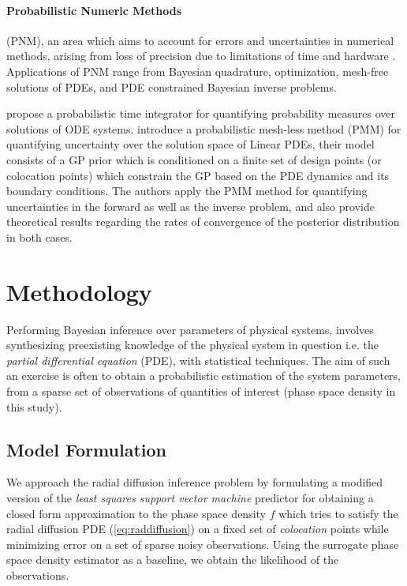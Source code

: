 \paragraph{Probabilistic Numeric Methods} (PNM), an area which aims to account for errors and 
uncertainties in numerical methods, arising from loss of precision due to limitations of time and 
hardware \citep{hennig2015probabilistic}. Applications of PNM range from Bayesian quadrature, 
optimization, mesh-free solutions of PDEs, and PDE constrained Bayesian inverse problems. 

\citet{conrad2017statistical} propose a probabilistic time integrator for quantifying probability 
measures over solutions of ODE systems. \citet{girolamiSullivanPDE} introduce a probabilistic 
mesh-less method (PMM) for quantifying uncertainty over the solution space of Linear PDEs, their 
model consists of a GP prior which is conditioned on a finite set of design points 
(or colocation points) which constrain the GP based on the PDE dynamics and its boundary 
conditions. The authors apply the PMM method for quantifying uncertainties in the forward as well 
as the inverse problem, and also provide theoretical results regarding the rates of convergence 
of the posterior distribution in both cases.

\section{Methodology}

Performing Bayesian inference over parameters of physical systems, involves synthesizing 
preexisting knowledge of the physical system in question i.e. the 
\emph{partial differential equation} (PDE), with statistical techniques. The aim of such an 
exercise is often to obtain a probabilistic estimation of the system parameters, from a 
sparse set of observations of quantities of interest (phase space density in this study). 


\subsection{Model Formulation}

We approach the radial diffusion inference problem by formulating a modified version of the 
\emph{least squares support vector machine} predictor for obtaining a closed form approximation to 
the phase space density $f$ which tries to satisfy the radial diffusion PDE 
(\cref{eq:raddiffusion}) on a fixed set of \emph{colocation} points while minimizing error on a set 
of sparse noisy observations. Using the surrogate phase space density estimator as a baseline, we 
obtain the likelihood of the observations.


